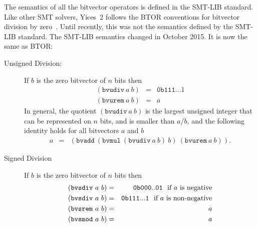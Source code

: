 \documentclass[11pt,twoside,fleqn,openright,titlepage]{cslreport}
\begin{document}
\medskip\noindent The semantics of all the bitvector operators is
defined in the SMT-LIB standard. Like other SMT solvers, Yices~2
follows the BTOR conventions for bitvector division by
zero~\cite{Brummayer-etal:2008}. Until recently, this was not the
semantics defined by the SMT-LIB standard. The SMT-LIB semantics
changed in October 2015. It is now the same as BTOR:
\begin{description}
\item[Unsigned Division:]  If $b$ is  the zero bitvector  of $n$
  bits then
\begin{eqnarray*}
(\mathtt{bvudiv}\ a\ b) & = & \mathtt{0b111...1} \\
(\mathtt{bvurem}\ a\ b) & = & a
\end{eqnarray*}
In  general, the  quotient $(\mathtt{bvudiv}\  a\ b)$  is  the largest
unsigned integer that  can be represented on $n$  bits, and is smaller
than $a/b$,  and the following  identity holds for all  bitvectors $a$
and $b$
\begin{eqnarray*}
a & = & (\mathtt{bvadd}\ (\mathtt{bvmul}\ (\mathtt{bvudiv}\ a\ b)\ b)\ (\mathtt{bvurem}\ a\ b)).
\end{eqnarray*}

\item[Signed Division] If $b$ is the zero bitvector of $n$ bits then
\begin{eqnarray*}
(\mathtt{bvsdiv}\ a\ b) & = & \mathtt{0b000..01}~~\mbox{\rm if $a$ is negative} \\
(\mathtt{bvsdiv}\ a\ b) & = & \mathtt{0b111...1}~~\mbox{\rm if $a$ is non-negative} \\
(\mathtt{bvsrem}\ a\ b) & = & a \\
(\mathtt{bvsmod}\ a\ b) & = & a
\end{eqnarray*}
\end{description}
\end{document}
